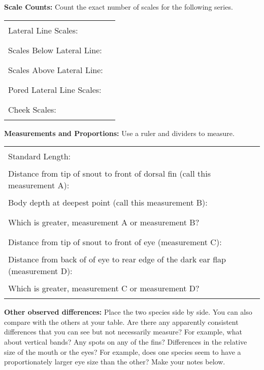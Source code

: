 \documentclass[11pt]{article}
\newcommand{\VSpace}{\vspace{\baselineskip}}
\begin{document}
\VSpace\VSpace

\textbf{Scale Counts:} Count the exact number of scales for the following series.\VSpace

\begin{tabular}{ll}

Lateral Line Scales: & \rule{3cm}{0.4pt} \\[1.5em]

Scales Below Lateral Line: & \rule{3cm}{0.4pt} \\[1.5em]

Scales Above Lateral Line: & \rule{3cm}{0.4pt} \\[1.5em]

Pored Lateral Line Scales: & \rule{3cm}{0.4pt} \\[1.5em]

Cheek Scales: & \rule{3cm}{0.4pt} \\

\end{tabular}

\newpage

\textbf{Measurements and Proportions:} Use a ruler and dividers to measure.\VSpace

\begin{tabular}{L{8.5cm}l}

Standard Length: & \rule{3cm}{0.4pt} \\[1.5em]

Distance from tip of snout to front of dorsal fin (call this measurement A): & \rule{3cm}{0.4pt} \\[1.5em]

Body depth at deepest point (call this measurement B): & \rule{3cm}{0.4pt} \\[1.5em]

Which is greater, measurement A or measurement B? & \rule{3cm}{0.4pt} \\[1.5em]

Distance from tip of snout to front of eye (measurement C): & \rule{3cm}{0.4pt} \\[1.5em]

Distance from back of of eye to rear edge of the dark ear flap (measurement D): & \rule{3cm}{0.4pt} \\[1.5em]

Which is greater, measurement C or measurement D? & \rule{3cm}{0.4pt} \\

\end{tabular}

\VSpace\VSpace

\textbf{Other observed differences:}  Place the two species side by side. You can also compare with the others at your table. Are there any apparently consistent differences that you can see but not necessarily measure?  For example, what about vertical bands? Any spots on any of the fins?  Differences in the relative size of the mouth or the eyes? For example, does one species seem to have a proportionately larger eye size than the other?  Make your notes below.
\end{document}
